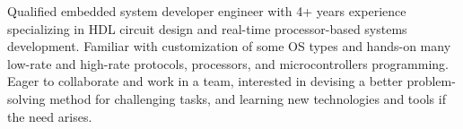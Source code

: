 

\begin{cvparagraph}

Qualified embedded system developer engineer with 4+ years experience specializing in HDL circuit design and real-time processor-based systems development. Familiar with customization of some OS types and hands-on many low-rate and high-rate protocols, processors, and microcontrollers programming. Eager to collaborate and work in a team, interested in devising a better problem-solving method for challenging tasks, and learning new technologies and tools if the need arises.
\end{cvparagraph}
